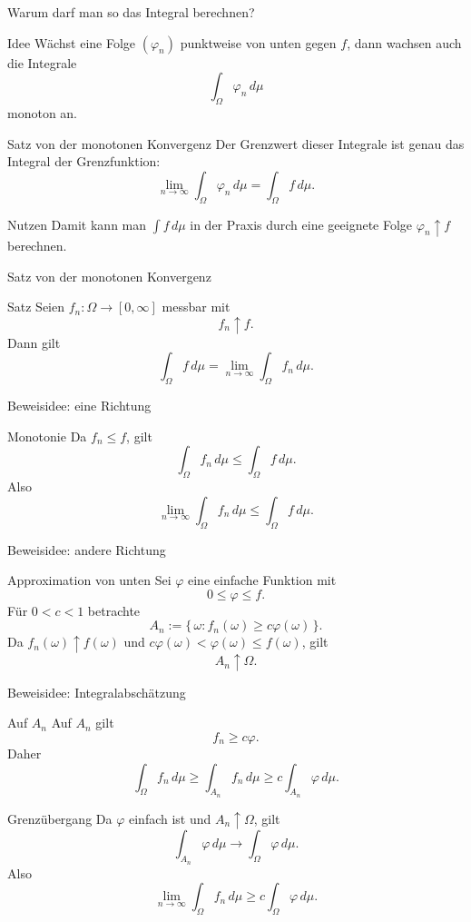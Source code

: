 \documentclass{beamer}
\begin{document}
\begin{frame}[shrink=5]{Warum darf man so das Integral berechnen?}
\begin{block}{Idee}
Wächst eine Folge \((\varphi_n)\) punktweise von unten gegen \(f\), dann wachsen auch die Integrale
\[
\int_\Omega \varphi_n\,d\mu
\]
monoton an.
\end{block}

\begin{block}{Satz von der monotonen Konvergenz}
Der Grenzwert dieser Integrale ist genau das Integral der Grenzfunktion:
\[
\lim_{n\to\infty}\int_\Omega \varphi_n\,d\mu
=
\int_\Omega f\,d\mu.
\]
\end{block}

\begin{block}{Nutzen}
Damit kann man \(\int f\,d\mu\) in der Praxis durch eine geeignete Folge
\(\varphi_n\uparrow f\) berechnen.
\end{block}
\end{frame}

\begin{frame}{Satz von der monotonen Konvergenz}
\begin{block}{Satz}
Seien \(f_n\colon\Omega\to[0,\infty]\) messbar mit
\[
f_n\uparrow f.
\]
Dann gilt
\[
\int_\Omega f\,d\mu
=
\lim_{n\to\infty}\int_\Omega f_n\,d\mu.
\]
\end{block}
\end{frame}

\begin{frame}{Beweisidee: eine Richtung}
\begin{block}{Monotonie}
Da \(f_n\le f\), gilt
\[
\int_\Omega f_n\,d\mu\le \int_\Omega f\,d\mu.
\]
Also
\[
\lim_{n\to\infty}\int_\Omega f_n\,d\mu
\le
\int_\Omega f\,d\mu.
\]
\end{block}
\end{frame}

\begin{frame}{Beweisidee: andere Richtung}
\begin{block}{Approximation von unten}
Sei \(\varphi\) eine einfache Funktion mit
\[
0\le \varphi\le f.
\]
Für \(0<c<1\) betrachte
\[
A_n:=\{\,\omega: f_n(\omega)\ge c\varphi(\omega)\,\}.
\]
Da \(f_n(\omega)\uparrow f(\omega)\) und \(c\varphi(\omega)<\varphi(\omega)\le f(\omega)\), gilt
\[
A_n\uparrow\Omega.
\]
\end{block}
\end{frame}

\begin{frame}{Beweisidee: Integralabschätzung}
\begin{block}{Auf \(A_n\)}
Auf \(A_n\) gilt
\[
f_n\ge c\varphi.
\]
Daher
\[
\int_\Omega f_n\,d\mu
\ge
\int_{A_n} f_n\,d\mu
\ge
c\int_{A_n}\varphi\,d\mu.
\]
\end{block}

\begin{block}{Grenzübergang}
Da \(\varphi\) einfach ist und \(A_n\uparrow\Omega\), gilt
\[
\int_{A_n}\varphi\,d\mu
\to
\int_\Omega \varphi\,d\mu.
\]
Also
\[
\lim_{n\to\infty}\int_\Omega f_n\,d\mu
\ge
c\int_\Omega \varphi\,d\mu.
\]
\end{block}
\end{frame}
\end{document}
